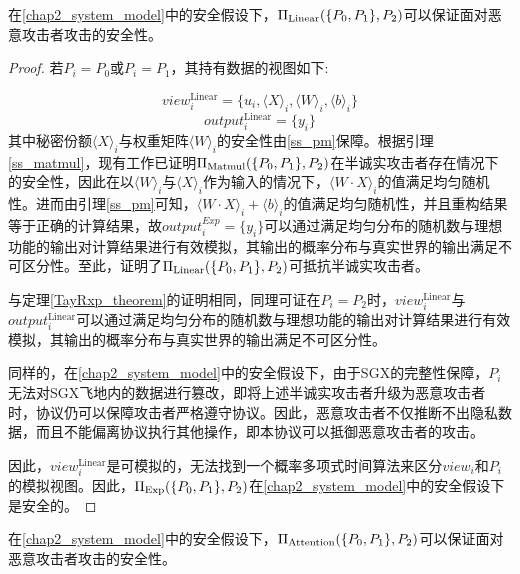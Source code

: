 \begin{theorem}
	\label{Linear_theorem}
	在\ref{chap2_system_model}中的安全假设下，$\Pi_{\rm Linear}(\{P_0, P_1\}, P_2)$可以保证面对恶意攻击者攻击的安全性。
\end{theorem}

\begin{proof}
	若$P_i=P_0$或$P_i=P_1$，其持有数据的视图如下:
	
	$$view_i^{\text{Linear}}=\{u_i, \langle X\rangle_i,\langle W\rangle_i, \langle b\rangle_i\}$$
	$$output_i^{\text{Linear}}=\{y_i\}$$
	其中秘密份额$\langle X\rangle_i$与权重矩阵$\langle W\rangle_i$的安全性由\ref{ss_pm}保障。根据引理\ref{ss_matmul}，现有工作已证明$\Pi_{\rm Matmul}(\{P_0, P_1\}, P_2)$在半诚实攻击者存在情况下的安全性，因此在以$\langle W\rangle_i$与$\langle X\rangle_i$作为输入的情况下，$\langle W\cdot X\rangle_i$的值满足均匀随机性。进而由引理\ref{ss_pm}可知，$\langle W\cdot X\rangle_i + \langle b\rangle_i$的值满足均匀随机性，并且重构结果等于正确的计算结果，故$output_i^{Exp}=\{y_i\}$可以通过满足均匀分布的随机数与理想功能的输出对计算结果进行有效模拟，其输出的概率分布与真实世界的输出满足不可区分性。至此，证明了$\Pi_{\rm Linear}(\{P_0, P_1\}, P_2)$可抵抗半诚实攻击者。
	
	与定理\ref{TayRxp_theorem}的证明相同，同理可证在$P_i=P_2$时，$view_i^{\text{Linear}}$与$output_i^{\text{Linear}}$可以通过满足均匀分布的随机数与理想功能的输出对计算结果进行有效模拟，其输出的概率分布与真实世界的输出满足不可区分性。
	
	同样的，在\ref{chap2_system_model}中的安全假设下，由于SGX的完整性保障\cite{SGX_Explained}，$P_i$无法对SGX飞地内的数据进行篡改，即将上述半诚实攻击者升级为恶意攻击者时，协议仍可以保障攻击者严格遵守协议。因此，恶意攻击者不仅推断不出隐私数据，而且不能偏离协议执行其他操作，即本协议可以抵御恶意攻击者的攻击。
	
	因此，$view_i^{\text{Linear}}$是可模拟的，无法找到一个概率多项式时间算法来区分$view_i$和$P_i$的模拟视图。因此，$\Pi_{\rm Exp}(\{P_0, P_1\}, P_2)$在\ref{chap2_system_model}中的安全假设下是安全的。

\end{proof}

\begin{theorem}
	\label{Attention_theorem}
	在\ref{chap2_system_model}中的安全假设下，$\Pi_{\rm Attention}(\{P_0, P_1\}, P_2)$可以保证面对恶意攻击者攻击的安全性。
\end{theorem}

